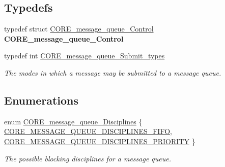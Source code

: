 \subsection*{Typedefs}
\begin{DoxyCompactItemize}
\item 
\mbox{\label{group__RTEMSScoreMessageQueue_ga1e092537383da83906a4d8dea257bb37}} 
typedef struct \mbox{\hyperlink{structCORE__message__queue__Control}{C\+O\+R\+E\+\_\+message\+\_\+queue\+\_\+\+Control}} {\bfseries C\+O\+R\+E\+\_\+message\+\_\+queue\+\_\+\+Control}
\item 
typedef int \mbox{\hyperlink{group__RTEMSScoreMessageQueue_ga0859edb437502e53fd2c7a73bce6b33c}{C\+O\+R\+E\+\_\+message\+\_\+queue\+\_\+\+Submit\+\_\+types}}
\begin{DoxyCompactList}\small\item\em The modes in which a message may be submitted to a message queue. \end{DoxyCompactList}\end{DoxyCompactItemize}
\subsection*{Enumerations}
\begin{DoxyCompactItemize}
\item 
enum \mbox{\hyperlink{group__RTEMSScoreMessageQueue_gaaeca88271cd9bc9ed7cf6996915481d0}{C\+O\+R\+E\+\_\+message\+\_\+queue\+\_\+\+Disciplines}} \{ \mbox{\hyperlink{group__RTEMSScoreMessageQueue_ggaaeca88271cd9bc9ed7cf6996915481d0aaee6e501f376da8c4495cf5e9114b35b}{C\+O\+R\+E\+\_\+\+M\+E\+S\+S\+A\+G\+E\+\_\+\+Q\+U\+E\+U\+E\+\_\+\+D\+I\+S\+C\+I\+P\+L\+I\+N\+E\+S\+\_\+\+F\+I\+FO}}, 
\mbox{\hyperlink{group__RTEMSScoreMessageQueue_ggaaeca88271cd9bc9ed7cf6996915481d0ae543ef8fec653c663fc43daba4d5a5f0}{C\+O\+R\+E\+\_\+\+M\+E\+S\+S\+A\+G\+E\+\_\+\+Q\+U\+E\+U\+E\+\_\+\+D\+I\+S\+C\+I\+P\+L\+I\+N\+E\+S\+\_\+\+P\+R\+I\+O\+R\+I\+TY}}
 \}
\begin{DoxyCompactList}\small\item\em The possible blocking disciplines for a message queue. \end{DoxyCompactList}\end{DoxyCompactItemize}
